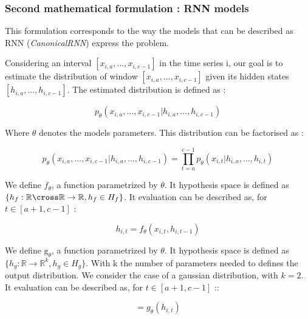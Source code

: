\subsubsection{Second mathematical formulation : RNN models}

This formulation corresponds to the way the models that can be described as RNN (\textit{CanonicalRNN}) express the problem.




Considering an interval $[x_{i,a},...,x_{i,c-1}]$ in the time series i,
our goal is to estimate the distribution of window $[x_{i,a},...,x_{i,c-1}]$ given its hidden states $[h_{i,a},...,h_{i,c-1}]$. The estimated distribution is defined as :

\begin{equation} \label{distrib2_proba_equ}
    p_{\theta}(x_{i,a}, ..., x_{i,c-1} | h_{i,a}, ..., h_{i,c-1}) 
\end{equation}

Where $\theta$ denotes the models parameters.
This distribution can be factorised as :

\begin{equation} \label{distrib2_proba_fact_equ}
    p_{\theta}(x_{i,a}, ..., x_{i,c-1} | h_{i,a}, ..., h_{i,c-1})  =
    \prod_{t=a}^{c-1}p_{\theta}(x_{i,t} | h_{i,a}, ..., h_{i,t})
\end{equation}

We define $f_\theta$, a function parametrized by $\theta$. It hypothesis space is defined as $\{ h_f : \mathbb{R} \cross \mathbb{R} \to \mathbb{R} , h_f \in H_f \}$.
It evaluation can be described as, for $t \in [a+1,c-1]$  :

\begin{equation}
    h_{i,t} = f_\theta({x_{i,t}},h_{i,t-1})
\end{equation}

We define $\text{g}_\theta$, a function parametrized by $\theta$. It hypothesis space is defined as $\{ h_g : \mathbb{R} \to \mathbb{R}^k , h_g \in H_g \}$. With k the number of parameters needed to defines the output distribution. 
We consider the case of a gaussian distribution, with $k=2$.
It evaluation can be described as, for $t \in [a+1,c-1]$ ::

\begin{equation}
    [\mu_{\theta i,t}, \sigma_{\theta i,t}] = g_\theta(h_{i,t})
\end{equation}

